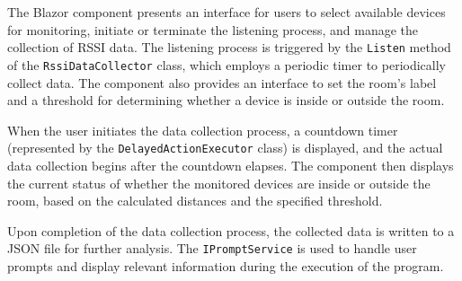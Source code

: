 The Blazor component presents an interface for users to select available devices for monitoring, initiate or terminate the listening process, and manage the collection of RSSI data. The listening process is triggered by the \texttt{Listen} method of the \texttt{RssiDataCollector} class, which employs a periodic timer to periodically collect data. The component also provides an interface to set the room's label and a threshold for determining whether a device is inside or outside the room.

When the user initiates the data collection process, a countdown timer (represented by the \texttt{DelayedActionExecutor} class) is displayed, and the actual data collection begins after the countdown elapses. The component then displays the current status of whether the monitored devices are inside or outside the room, based on the calculated distances and the specified threshold.

Upon completion of the data collection process, the collected data is written to a JSON file for further analysis. The \texttt{IPromptService} is used to handle user prompts and display relevant information during the execution of the program.
